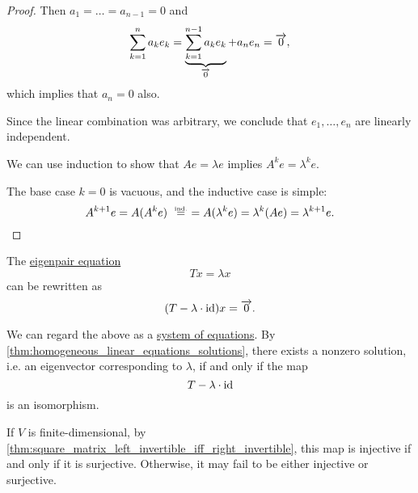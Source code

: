 \begin{proof}
  Then \( a_1 = \ldots = a_{n-1} = 0 \) and
  \begin{equation*}
    \sum_{k=1}^n a_k e_k = \underbrace{\sum_{k=1}^{n-1} a_k e_k}_{\overrightarrow{0}} + a_n e_n = \overrightarrow{0},
  \end{equation*}
  which implies that \( a_n = 0 \) also.

  Since the linear combination was arbitrary, we conclude that \( e_1, \ldots, e_n \) are linearly independent.

   We can use induction to show that \( Ae = \lambda e \) implies \( A^k e = \lambda ^k e \).

  The base case \( k = 0 \) is vacuous, and the inductive case is simple:
  \begin{equation*}
    A^{k+1} e
    =
    A (A^k e)
    \reloset {\T{ind.}} =
    =
    A (\lambda^k e)
    =
    \lambda^k (Ae)
    =
    \lambda^{k+1} e.
  \end{equation*}
\end{proof}

\begin{remark}\label{rem:eigenpairs_via_invertibility}
  The \hyperref[def:eigenpair]{eigenpair equation}
  \begin{equation*}
    Tx = \lambda x
  \end{equation*}
  can be rewritten as
  \begin{equation*}
    (T - \lambda \cdot \operatorname{id}) x = \overrightarrow{0}.
  \end{equation*}

  We can regard the above as a \hyperref[def:system_of_linear_equations]{system of equations}. By \cref{thm:homogeneous_linear_equations_solutions}, there exists a nonzero solution, i.e. an eigenvector corresponding to \( \lambda \), if and only if the map
  \begin{equation*}
    T - \lambda \cdot \operatorname{id}
  \end{equation*}
  is an isomorphism.

  If \( V \) is finite-dimensional, by \cref{thm:square_matrix_left_invertible_iff_right_invertible}, this map is injective if and only if it is surjective. Otherwise, it may fail to be either injective or surjective.
\end{remark}

